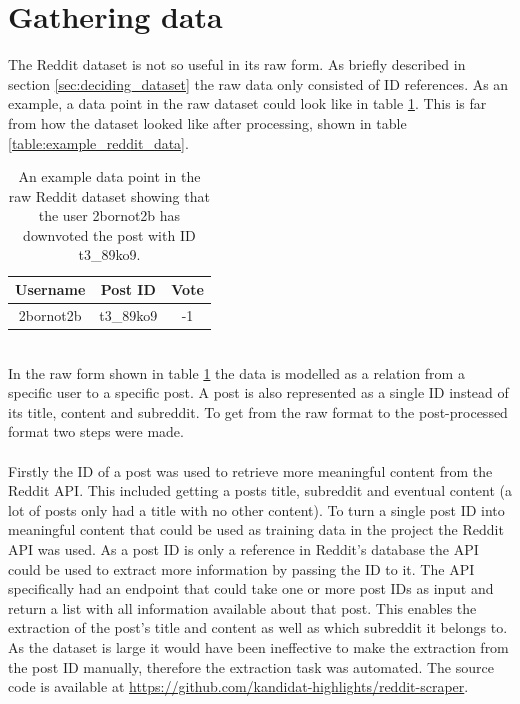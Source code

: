 \section{Gathering data}\label{sec:gathering_data}
The Reddit dataset is not so useful in its raw form. As briefly described in section \ref{sec:deciding_dataset} the raw data only consisted of ID references. As an example, a data point in the raw dataset could look like in table \ref{table:raw_reddit_data}. This is far from how the dataset looked like after processing, shown in table \ref{table:example_reddit_data}.
\begin{table}[h!]
    \centering
    \begin{tabular}{ c c c } 
        \hline
        \textbf{Username} & \textbf{Post ID} & \textbf{Vote} \\
        \hline
        \hline
        2bornot2b & t3\_89ko9 &-1\\
        \hline
    \end{tabular}
    \caption{An example data point in the raw Reddit dataset showing that the user 2bornot2b has downvoted the post with ID t3\_89ko9.}
    \label{table:raw_reddit_data}
\end{table}
\\
In the raw form shown in table \ref{table:raw_reddit_data} the data is modelled as a relation from a specific user to a specific post. A post is also represented as a single ID instead of its title, content and subreddit. To get from the raw format to the post-processed format two steps were made.   
\\\\
Firstly the ID of a post was used to retrieve more meaningful content from the Reddit API. This included getting a posts title, subreddit and eventual content (a lot of posts only had a title with no other content). To turn a single post ID into meaningful content that could be used as training data in the project the Reddit API was used. As a post ID is only a reference in Reddit's database the API could be used to extract more information by passing the ID to it. The API specifically had an endpoint that could take one or more post IDs as input and return a list with all information available about that post. This enables the extraction of the post's title and content as well as which subreddit it belongs to. As the dataset is large it would have been ineffective to make the extraction from the post ID manually, therefore the extraction task was automated. The source code is available at \url{https://github.com/kandidat-highlights/reddit-scraper}.
